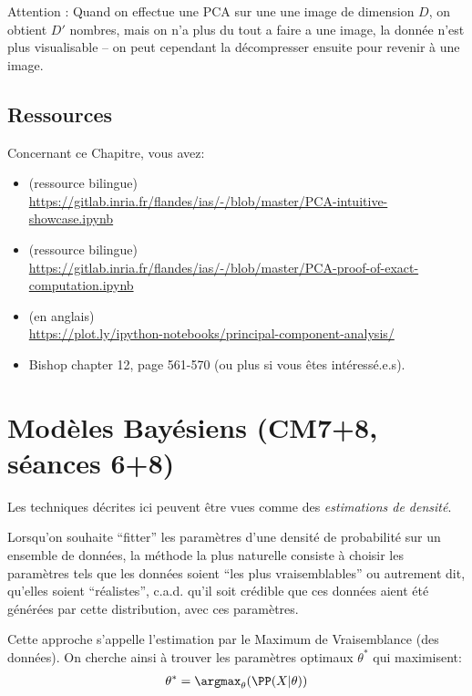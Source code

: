 \documentclass[french,twoside]{article}
\begin{document}
Attention : Quand on effectue une PCA sur une une image de dimension $D$, on obtient $D'$ nombres, mais on n'a plus du tout a faire a une image, la donnée n'est plus visualisable -- on peut cependant la décompresser ensuite pour revenir à une image.

\subsection{Ressources}

Concernant ce Chapitre, vous avez:
\begin{itemize}
    \item (ressource bilingue)\\
\url{https://gitlab.inria.fr/flandes/ias/-/blob/master/PCA-intuitive-showcase.ipynb}
\item (ressource bilingue)\\
\url{https://gitlab.inria.fr/flandes/ias/-/blob/master/PCA-proof-of-exact-computation.ipynb}
\item (en anglais)\\
\url{https://plot.ly/ipython-notebooks/principal-component-analysis/}
\item Bishop \cite{bishop} chapter 12, page 561-570 (ou plus si vous êtes intéressé.e.s).
\end{itemize}

\newpage












\section{Modèles Bayésiens (CM7+8, séances 6+8)}


Les techniques décrites ici peuvent être vues comme des \textit{estimations de densité}.

Lorsqu'on souhaite ``fitter'' les paramètres d'une densité de probabilité sur un ensemble de données, la méthode la plus naturelle consiste à choisir les paramètres tels que les données soient ``les plus vraisemblables'' ou autrement dit, qu'elles soient ``réalistes'', c.a.d. qu'il soit crédible que ces données aient été générées par cette distribution, avec ces paramètres.

Cette approche s'appelle l'estimation par le Maximum de Vraisemblance (des données).
On cherche ainsi à trouver les paramètres optimaux $\theta^*$ qui maximisent:
\begin{align}
\theta^* = \argmax_\theta (\PP (X|\theta))
\end{align}
\end{document}
